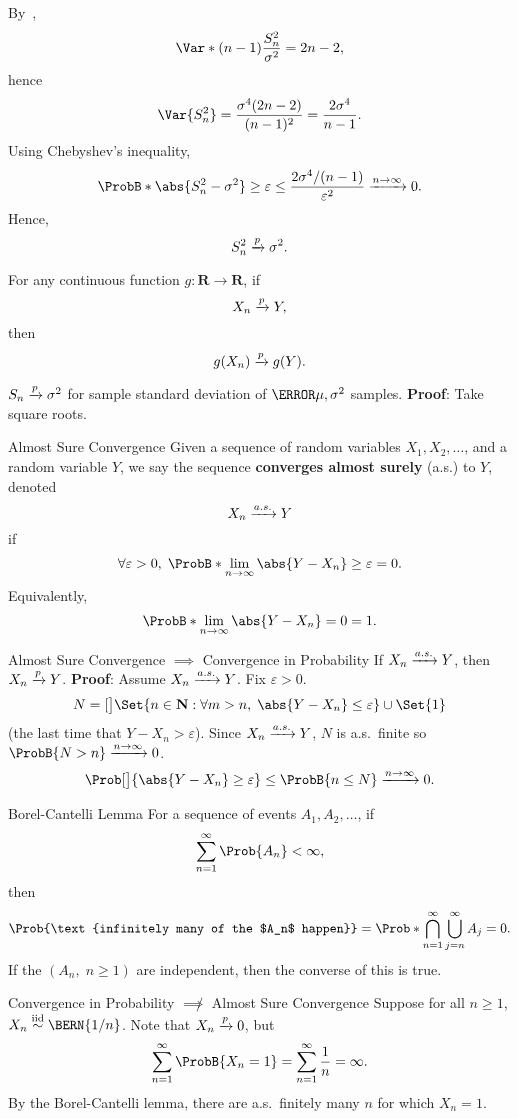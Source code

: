 \begin{Example}{}{}
    By~,
    \[ \Var*{(n-1)\frac{S_n^2}{\sigma^2}}=2n-2, \]
    hence
    \[ \Var{S_n^2}=\frac{\sigma^4(2n-2)}{(n-1)^2}=\frac{2\sigma^4}{n-1}. \]
    Using Chebyshev's inequality,
    \[ \ProbB*{\abs{S_n^2-\sigma^2}\ge \varepsilon}\le \frac{2\sigma^4/(n-1)}{\varepsilon^2}\xrightarrow{n\to\infty} 0. \]
    Hence,
    \[ S_n^2\xrightarrow[]{p} \sigma^2. \]
\end{Example}
\begin{Theorem}{}{}
    For any continuous function $ g\colon\mathbf{R}\to\mathbf{R} $, if
    \[ X_n\xrightarrow[]{p} Y, \]
    then
    \[ g(X_n)\xrightarrow[]{p} g(Y). \]
\end{Theorem}
\begin{Corollary}{}{}
    $ S_n\xrightarrow[]{p} \sigma^2 $ for sample standard deviation of $ \N{\mu,\sigma^2} $
    samples.
    \tcblower{}
    \textbf{Proof}: Take square roots.
\end{Corollary}
\begin{Definition}{Almost Sure Convergence}{}
    Given a sequence of random variables $ X_1,X_2,\ldots $,
    and a random variable $ Y $, we say the sequence
    \textbf{converges almost surely} (a.s.) to $ Y $, denoted
    \[ X_n\xrightarrow[]{a.s.} Y \]
    if
    \[ \forall \varepsilon>0,\; \ProbB*{\lim\limits_{{n} \to {\infty}}\abs{Y-X_n}\ge \varepsilon}=0. \]
    Equivalently,
    \[ \ProbB*{\lim\limits_{{n} \to {\infty}}\abs{Y-X_n}=0}=1. \]
\end{Definition}
\begin{Theorem}{Almost Sure Convergence $ \implies $ Convergence in Probability}{}
    If $ X_n\xrightarrow[]{a.s.} Y $, then $ X_n\xrightarrow[]{p} Y $.
    \tcblower{}
    \textbf{Proof}: Assume $ X_n\xrightarrow[]{a.s.} Y $. Fix $ \varepsilon>0 $.
    \[ N=\max[\big]{\Set{n\in\mathbf{N}\given \forall m>n,\; \abs{Y-X_n}\le \varepsilon}\cup\Set{1}} \]
    (the last time that $ Y-X_n>\varepsilon $). Since
    $ X_n\xrightarrow[]{a.s.} Y $, $ N $ is a.s.\ finite so $ \ProbB{N>n}\xrightarrow{n\to\infty}0 $.
    \[ \Prob[\big]{\abs{Y-X_n}\ge \varepsilon}
        \le \ProbB{n\le N}
        \xrightarrow{n\to\infty}0. \]
\end{Theorem}
\begin{Lemma}{Borel-Cantelli Lemma}{}
    For a sequence of events $ A_1,A_2,\ldots $, if
    \[ \sum_{n=1}^{\infty}\Prob{A_n}<\infty, \]
    then
    \[ \Prob{\text{infinitely many of the $A_n$ happen}}
        =\Prob*{\bigcap_{n=1}^\infty\bigcup_{j=n}^\infty A_j}=0. \]
    If the $ (A_n,\; n\ge 1) $ are independent, then the converse of this is true.
\end{Lemma}
\begin{Example}{Convergence in Probability $\not\implies$ Almost Sure Convergence}{}
    Suppose for all $ n\ge 1 $, $ X_n\iid \BERN{1/n} $.
    Note that $ X_n\xrightarrow[]{p} 0 $, but
    \[ \sum_{n=1}^{\infty}\ProbB{X_n=1}=\sum_{n=1}^{\infty}\frac{1}{n}=\infty. \]
    By the Borel-Cantelli lemma, there are a.s.\ finitely many $ n $
    for which $ X_n=1 $.
\end{Example}